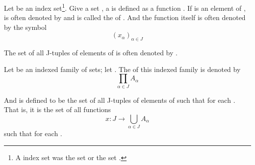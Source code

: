 \begin{definition}[J-tuple]\label{def:JTuple}
      Let  be an index set\footnote{
            A index set was the set  or the set .
      }. Give a set , a  is defined as a function . If \mt{\alpha} is an element of ,  is often denoted by  and is called the   of . And the function  itself is often denoted by the symbol
      \begin{equation*}
            (x_{\alpha})_{\alpha \in J}
      \end{equation*}

      The set of all J-tuples of elements of  is often denoted by .
\end{definition}

\begin{definition}\label{def:CartesianProduct}
      Let  be an indexed family of sets; let . The  of this indexed family is denoted by
      \begin{equation*}
            \displaystyle
            \prod_{\alpha \in J} A_{\alpha}
      \end{equation*}

      And is defined to be the set of all J-tuples  of elements of  such that  for each . That is, it is the set of all functions
      \begin{equation*}
            x: J \rightarrow \bigcup_{\alpha \in J} A_{\alpha}
      \end{equation*}
      such that  for each .
\end{definition}

